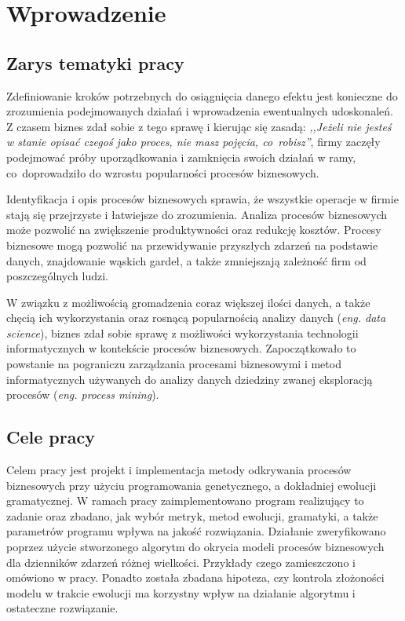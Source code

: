 \chapter{Wprowadzenie}
\label{cha:wprowadzenie}


\section{Zarys tematyki pracy}
\label{sec:zarysPracy}

Zdefiniowanie kroków potrzebnych do osiągnięcia danego efektu jest konieczne do zrozumienia podejmowanych działań i wprowadzenia ewentualnych udoskonaleń. Z czasem biznes zdał sobie z tego sprawę i kierując się zasadą: \textit{,,Jeżeli nie jesteś w stanie opisać czegoś jako proces, nie masz pojęcia, co~robisz''}, firmy zaczęły podejmować próby uporządkowania i zamknięcia swoich działań w ramy, co~doprowadziło do wzrostu popularności procesów biznesowych.

Identyfikacja i opis procesów biznesowych sprawia, że wszystkie operacje w firmie stają się przejrzyste i łatwiejsze do zrozumienia. Analiza procesów biznesowych może pozwolić na zwiększenie produktywności oraz redukcję kosztów. Procesy biznesowe mogą pozwolić na przewidywanie przyszłych zdarzeń na podstawie danych, znajdowanie wąskich gardeł, a także zmniejszają zależność firm od poszczególnych ludzi.

W związku z możliwością gromadzenia coraz większej ilości danych, a także chęcią ich wykorzystania oraz rosnącą popularnością analizy danych (\textit{eng. data science}), biznes zdał sobie sprawę z możliwości wykorzystania technologii informatycznych w kontekście procesów biznesowych. Zapoczątkowało to powstanie na pograniczu zarządzania procesami biznesowymi i metod informatycznych używanych do analizy danych dziedziny zwanej eksploracją procesów (\textit{eng. process mining}).
 
\section{Cele pracy}
\label{sec:celePracy}

Celem pracy jest projekt i implementacja metody odkrywania procesów biznesowych przy użyciu programowania genetycznego, a dokładniej ewolucji gramatycznej. W ramach pracy zaimplementowano program realizujący to zadanie oraz zbadano, jak wybór metryk, metod ewolucji, gramatyki, a także parametrów programu wpływa na jakość rozwiązania. Działanie zweryfikowano poprzez użycie stworzonego algorytm do okrycia modeli procesów biznesowych dla dzienników zdarzeń różnej wielkości. Przykłady czego zamieszczono i omówiono w pracy. Ponadto została zbadana hipoteza, czy kontrola złożoności modelu w trakcie ewolucji ma korzystny wpływ na działanie algorytmu i ostateczne rozwiązanie.

